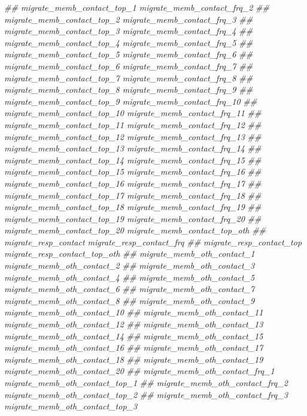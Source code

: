 \documentclass[
]{article}
\newenvironment{Shaded}{\begin{snugshade}}{\end{snugshade}}
\newcommand{\CommentTok}[1]{\textcolor[rgb]{0.56,0.35,0.01}{\textit{#1}}}
\begin{document}
\begin{Shaded}
\begin{Highlighting}[]
\CommentTok{##      migrate_memb_contact_top_1 migrate_memb_contact_frq_2}
\CommentTok{##      migrate_memb_contact_top_2 migrate_memb_contact_frq_3}
\CommentTok{##      migrate_memb_contact_top_3 migrate_memb_contact_frq_4}
\CommentTok{##      migrate_memb_contact_top_4 migrate_memb_contact_frq_5}
\CommentTok{##      migrate_memb_contact_top_5 migrate_memb_contact_frq_6}
\CommentTok{##      migrate_memb_contact_top_6 migrate_memb_contact_frq_7}
\CommentTok{##      migrate_memb_contact_top_7 migrate_memb_contact_frq_8}
\CommentTok{##      migrate_memb_contact_top_8 migrate_memb_contact_frq_9}
\CommentTok{##      migrate_memb_contact_top_9 migrate_memb_contact_frq_10}
\CommentTok{##      migrate_memb_contact_top_10 migrate_memb_contact_frq_11}
\CommentTok{##      migrate_memb_contact_top_11 migrate_memb_contact_frq_12}
\CommentTok{##      migrate_memb_contact_top_12 migrate_memb_contact_frq_13}
\CommentTok{##      migrate_memb_contact_top_13 migrate_memb_contact_frq_14}
\CommentTok{##      migrate_memb_contact_top_14 migrate_memb_contact_frq_15}
\CommentTok{##      migrate_memb_contact_top_15 migrate_memb_contact_frq_16}
\CommentTok{##      migrate_memb_contact_top_16 migrate_memb_contact_frq_17}
\CommentTok{##      migrate_memb_contact_top_17 migrate_memb_contact_frq_18}
\CommentTok{##      migrate_memb_contact_top_18 migrate_memb_contact_frq_19}
\CommentTok{##      migrate_memb_contact_top_19 migrate_memb_contact_frq_20}
\CommentTok{##      migrate_memb_contact_top_20 migrate_memb_contact_top_oth}
\CommentTok{##      migrate_resp_contact migrate_resp_contact_frq}
\CommentTok{##      migrate_resp_contact_top migrate_resp_contact_top_oth}
\CommentTok{##      migrate_memb_oth_contact_1 migrate_memb_oth_contact_2}
\CommentTok{##      migrate_memb_oth_contact_3 migrate_memb_oth_contact_4}
\CommentTok{##      migrate_memb_oth_contact_5 migrate_memb_oth_contact_6}
\CommentTok{##      migrate_memb_oth_contact_7 migrate_memb_oth_contact_8}
\CommentTok{##      migrate_memb_oth_contact_9 migrate_memb_oth_contact_10}
\CommentTok{##      migrate_memb_oth_contact_11 migrate_memb_oth_contact_12}
\CommentTok{##      migrate_memb_oth_contact_13 migrate_memb_oth_contact_14}
\CommentTok{##      migrate_memb_oth_contact_15 migrate_memb_oth_contact_16}
\CommentTok{##      migrate_memb_oth_contact_17 migrate_memb_oth_contact_18}
\CommentTok{##      migrate_memb_oth_contact_19 migrate_memb_oth_contact_20}
\CommentTok{##      migrate_memb_oth_contact_frq_1 migrate_memb_oth_contact_top_1}
\CommentTok{##      migrate_memb_oth_contact_frq_2 migrate_memb_oth_contact_top_2}
\CommentTok{##      migrate_memb_oth_contact_frq_3 migrate_memb_oth_contact_top_3}

\end{Highlighting}
\end{Shaded}
\end{document}
